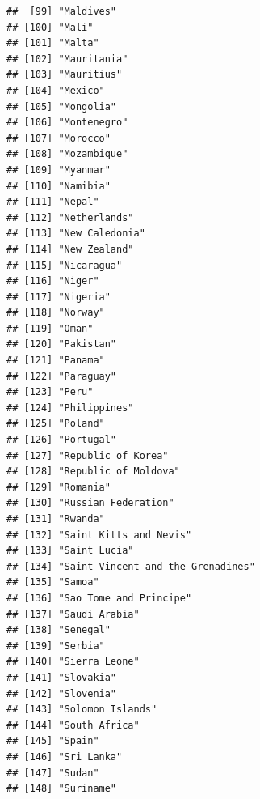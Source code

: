 \documentclass[]{article}
\begin{document}
\begin{verbatim}
##  [99] "Maldives"                                 
## [100] "Mali"                                     
## [101] "Malta"                                    
## [102] "Mauritania"                               
## [103] "Mauritius"                                
## [104] "Mexico"                                   
## [105] "Mongolia"                                 
## [106] "Montenegro"                               
## [107] "Morocco"                                  
## [108] "Mozambique"                               
## [109] "Myanmar"                                  
## [110] "Namibia"                                  
## [111] "Nepal"                                    
## [112] "Netherlands"                              
## [113] "New Caledonia"                            
## [114] "New Zealand"                              
## [115] "Nicaragua"                                
## [116] "Niger"                                    
## [117] "Nigeria"                                  
## [118] "Norway"                                   
## [119] "Oman"                                     
## [120] "Pakistan"                                 
## [121] "Panama"                                   
## [122] "Paraguay"                                 
## [123] "Peru"                                     
## [124] "Philippines"                              
## [125] "Poland"                                   
## [126] "Portugal"                                 
## [127] "Republic of Korea"                        
## [128] "Republic of Moldova"                      
## [129] "Romania"                                  
## [130] "Russian Federation"                       
## [131] "Rwanda"                                   
## [132] "Saint Kitts and Nevis"                    
## [133] "Saint Lucia"                              
## [134] "Saint Vincent and the Grenadines"         
## [135] "Samoa"                                    
## [136] "Sao Tome and Principe"                    
## [137] "Saudi Arabia"                             
## [138] "Senegal"                                  
## [139] "Serbia"                                   
## [140] "Sierra Leone"                             
## [141] "Slovakia"                                 
## [142] "Slovenia"                                 
## [143] "Solomon Islands"                          
## [144] "South Africa"                             
## [145] "Spain"                                    
## [146] "Sri Lanka"                                
## [147] "Sudan"                                    
## [148] "Suriname"                                 

\end{verbatim}
\end{document}
